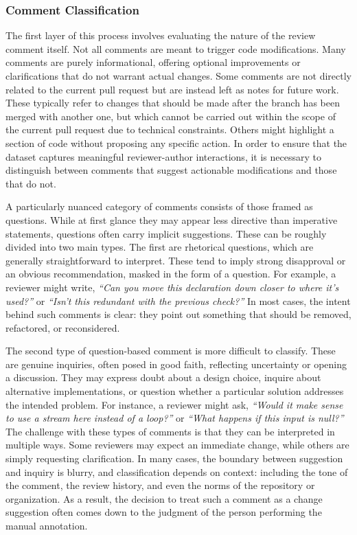 \subsubsection{Comment Classification}
The first layer of this process involves evaluating the nature of the review comment itself. Not all
comments are meant to trigger code modifications. Many comments are purely informational, offering
optional improvements or clarifications that do not warrant actual changes. Some comments are not
directly related to the current pull request but are instead left as notes for future work. These
typically refer to changes that should be made after the branch has been merged with another one,
but which cannot be carried out within the scope of the current pull request due to technical
constraints. Others might highlight a section of code without proposing any specific action. In
order to ensure that the dataset captures meaningful reviewer-author interactions, it is necessary
to distinguish between comments that suggest actionable modifications and those that do not.

A particularly nuanced category of comments consists of those framed as questions. While at first
glance they may appear less directive than imperative statements, questions often carry implicit
suggestions. These can be roughly divided into two main types. The first are rhetorical questions,
which are generally straightforward to interpret. These tend to imply strong disapproval or an
obvious recommendation, masked in the form of a question. For example, a reviewer might write,
\textit{``Can you move this declaration down closer to where it's used?''} or \textit{``Isn't this
redundant with the previous check?''} In most cases, the intent behind such comments is clear: they
point out something that should be removed, refactored, or reconsidered.

The second type of question-based comment is more difficult to classify. These are genuine
inquiries, often posed in good faith, reflecting uncertainty or opening a discussion. They may
express doubt about a design choice, inquire about alternative implementations, or question whether
a particular solution addresses the intended problem. For instance, a reviewer might ask,
\textit{“Would it make sense to use a stream here instead of a loop?”} or \textit{“What happens if
this input is null?”} The challenge with these types of comments is that they can be interpreted in
multiple ways. Some reviewers may expect an immediate change, while others are simply requesting
clarification. In many cases, the boundary between suggestion and inquiry is blurry, and
classification depends on context: including the tone of the comment, the review history, and even
the norms of the repository or organization. As a result, the decision to treat such a comment as a
change suggestion often comes down to the judgment of the person performing the manual annotation.

